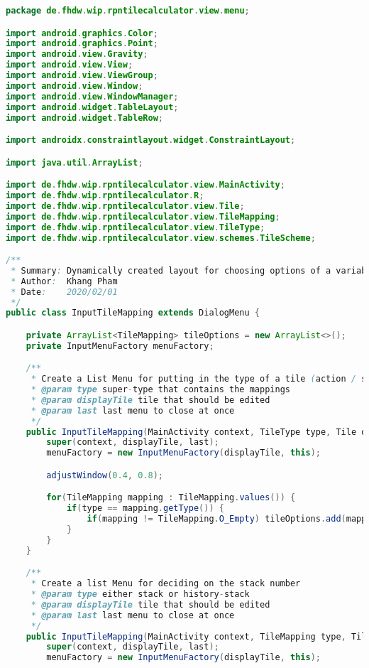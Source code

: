\begin{lstlisting}[caption=InputTileMapping,label=list:InputTileMapping,language=Java]
package de.fhdw.wip.rpntilecalculator.view.menu;

import android.graphics.Color;
import android.graphics.Point;
import android.view.Gravity;
import android.view.View;
import android.view.ViewGroup;
import android.view.Window;
import android.view.WindowManager;
import android.widget.TableLayout;
import android.widget.TableRow;

import androidx.constraintlayout.widget.ConstraintLayout;

import java.util.ArrayList;

import de.fhdw.wip.rpntilecalculator.view.MainActivity;
import de.fhdw.wip.rpntilecalculator.R;
import de.fhdw.wip.rpntilecalculator.view.Tile;
import de.fhdw.wip.rpntilecalculator.view.TileMapping;
import de.fhdw.wip.rpntilecalculator.view.TileType;
import de.fhdw.wip.rpntilecalculator.view.schemes.TileScheme;

/**
 * Summary: Dynamically created layout for choosing options of a variably long list of tiles
 * Author:  Khang Pham
 * Date:    2020/02/01
 */
public class InputTileMapping extends DialogMenu {

    private ArrayList<TileMapping> tileOptions = new ArrayList<>();
    private InputMenuFactory menuFactory;

    /**
     * Create a List Menu for putting in the type of a tile (action / setting / operand)
     * @param type super-type that contains the mappings
     * @param displayTile tile that should be edited
     * @param last last menu to close at once
     */
    public InputTileMapping(MainActivity context, TileType type, Tile displayTile, DialogMenu last) {
        super(context, displayTile, last);
        menuFactory = new InputMenuFactory(displayTile, this);

        adjustWindow(0.4, 0.8);

        for(TileMapping mapping : TileMapping.values()) {
            if(type == mapping.getType()) {
                if(mapping != TileMapping.O_Empty) tileOptions.add(mapping);
            }
        }
    }

    /**
     * Create a list Menu for deciding on the stack number
     * @param type either stack or history-stack
     * @param displayTile tile that should be edited
     * @param last last menu to close at once
     */
    public InputTileMapping(MainActivity context, TileMapping type, Tile displayTile, DialogMenu last) {
        super(context, displayTile, last);
        menuFactory = new InputMenuFactory(displayTile, this);


\end{lstlisting}
